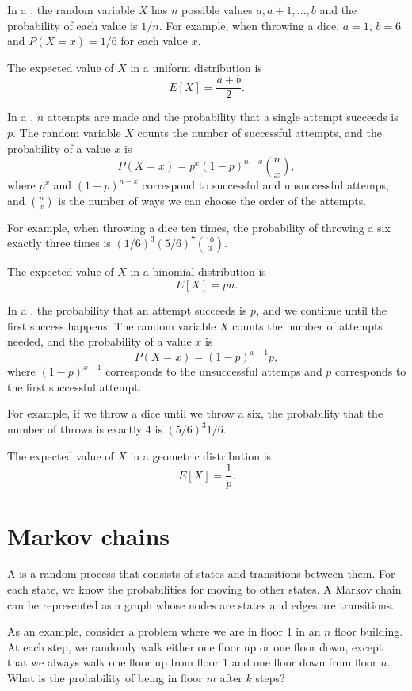 In a ,
the random variable $X$ has $n$ possible
values $a,a+1,\ldots,b$ and the probability of each value is $1/n$.
For example, when throwing a dice,
$a=1$, $b=6$ and $P(X=x)=1/6$ for each value $x$.

The expected value of $X$ in a uniform distribution is
\[E[X] = \frac{a+b}{2}.\]

In a , $n$ attempts
are made
and the probability that a single attempt succeeds
is $p$.
The random variable $X$ counts the number of
successful attempts,
and the probability of a value $x$ is
\[P(X=x)=p^x (1-p)^{n-x} {n \choose x},\]
where $p^x$ and $(1-p)^{n-x}$ correspond to
successful and unsuccessful attemps,
and ${n \choose x}$ is the number of ways
we can choose the order of the attempts.

For example, when throwing a dice ten times,
the probability of throwing a six exactly
three times is $(1/6)^3 (5/6)^7 {10 \choose 3}$.

The expected value of $X$ in a binomial distribution is
\[E[X] = pn.\]

In a ,
the probability that an attempt succeeds is $p$,
and we continue until the first success happens.
The random variable $X$ counts the number
of attempts needed, and the probability of
a value $x$ is
\[P(X=x)=(1-p)^{x-1} p,\]
where $(1-p)^{x-1}$ corresponds to the unsuccessful attemps
and $p$ corresponds to the first successful attempt.

For example, if we throw a dice until we throw a six,
the probability that the number of throws
is exactly 4 is $(5/6)^3 1/6$.

The expected value of $X$ in a geometric distribution is
\[E[X]=\frac{1}{p}.\]

\section{Markov chains}


A 
is a random process
that consists of states and transitions between them.
For each state, we know the probabilities
for moving to other states.
A Markov chain can be represented as a graph
whose nodes are states and edges are transitions.

As an example, consider a problem
where we are in floor 1 in an $n$ floor building.
At each step, we randomly walk either one floor
up or one floor down, except that we always
walk one floor up from floor 1 and one floor down
from floor $n$.
What is the probability of being in floor $m$
after $k$ steps?

